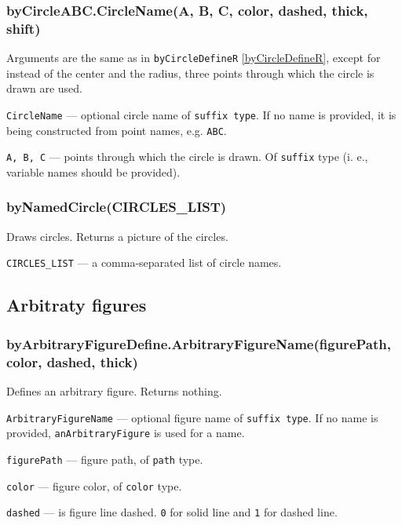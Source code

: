 \documentclass{ltxdoc}
\begin{document}
\subsubsection{byCircleABC.CircleName(A, B, C, color, dashed, thick, shift)}\label{byCircleABC}
	
	Arguments are the same as in \texttt{byCircleDefineR} \ref{byCircleDefineR}, except for instead of the center and the radius, three points through which the circle is drawn are used.
	
	\texttt{CircleName} — optional circle name of \texttt{suffix type}. If no name is provided, it is being constructed from point names, e.g. \texttt{ABC}.
	
	\texttt{A, B, C} — points through which the circle is drawn. Of \texttt{suffix} type (i. e., variable names should be provided).


\subsubsection{byNamedCircle(CIRCLES\_LIST)}\label{byNamedCircle}
	
	Draws circles. Returns a picture of the circles.
	
	\texttt{CIRCLES\_LIST} — a comma-separated list of circle names.

\subsection{Arbitraty figures}

\subsubsection{byArbitraryFigureDefine.ArbitraryFigureName(figurePath, color, dashed, thick)}\label{byArbitraryFigureDefine}
	
	Defines an arbitrary figure. Returns nothing.
	
	\texttt{ArbitraryFigureName} — optional figure name of \texttt{suffix type}. If no name is provided, \texttt{anArbitraryFigure} is used for a name.
	
	\texttt{figurePath} — figure path, of \texttt{path} type.
	
	\texttt{color} — figure color, of \texttt{color} type.
	
	\texttt{dashed} — is figure line dashed. \texttt{0} for solid line and \texttt{1} for dashed line.
	
\end{document}
